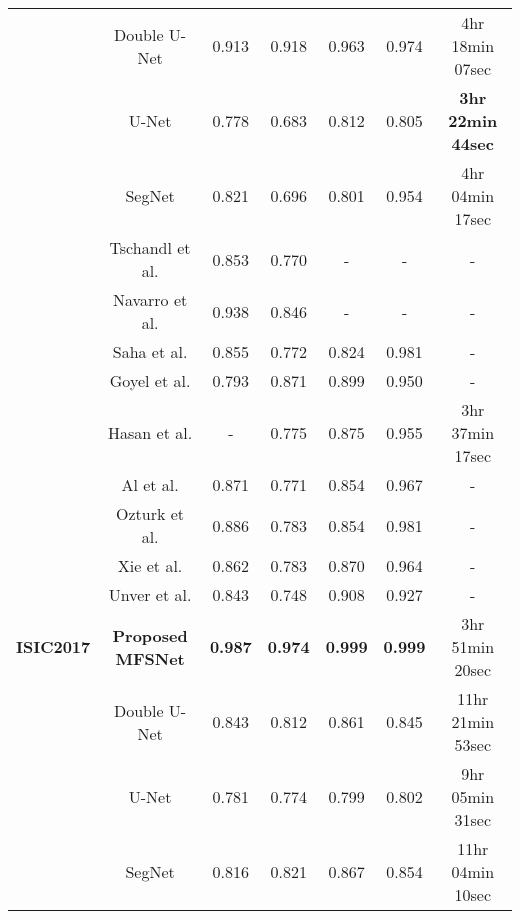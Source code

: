 \documentclass[review]{elsarticle}
\begin{document}
\begin{table}[]
{\begin{tabular}{|c|c|c|c|c|c|c|}
 & Double   U-Net \cite{jha2020doubleu}          & 0.913 & 0.918 & 0.963  & 0.974 & 4hr 18min 07sec          \\ \cline{2-7} 
 & U-Net \cite{ronneberger2015u}                 & 0.778 & 0.683 & 0.812  & 0.805 & \textbf{3hr 22min 44sec} \\ \cline{2-7} 
 & SegNet \cite{badrinarayanan2017segnet}        & 0.821 & 0.696 & 0.801  & 0.954 & 4hr 04min 17sec          \\ \cline{2-7} 
 & Tschandl et al. \cite{tschandl2019domain}     & 0.853 & 0.770 & -      & -     & -                        \\ \cline{2-7} 
 & Navarro et al. \cite{navarro2018accurate}     & 0.938 & 0.846 & -      & -     & -                        \\ \cline{2-7} 
 & Saha et al. \cite{saha2020leveraging}         & 0.855 & 0.772 & 0.824  & 0.981 & -                        \\ \cline{2-7} 
 & Goyel et al. \cite{goyal2019skin}             & 0.793 & 0.871 & 0.899  & 0.950 & -                        \\ \cline{2-7} 
 & Hasan et al. \cite{hasan2020dsnet}            & -     & 0.775 & 0.875  & 0.955 & 3hr 37min 17sec          \\ \cline{2-7} 
 & Al et al. \cite{al2018skin}                   & 0.871 & 0.771 & 0.854  & 0.967 & -                        \\ \cline{2-7} 
 & Ozturk et al. \cite{ozturk2020skin}           & 0.886 & 0.783 & 0.854  & 0.981 & -                        \\ \cline{2-7} 
 & Xie et al. \cite{xie2020skin}                 & 0.862 & 0.783 & 0.870  & 0.964 & -                        \\ \cline{2-7} 
 & Unver et al. \cite{unver2019skin}             & 0.843 & 0.748 & 0.908  & 0.927 & -                        \\ \cline{2-7} 
\multirow{-13}{*}{\textbf{ISIC2017}} & \textbf{Proposed MFSNet} & \textbf{0.987} & \textbf{0.974} & \textbf{0.999} & \textbf{0.999} & 3hr 51min 20sec              \\ \hline
 & Double   U-Net \cite{jha2020doubleu}          & 0.843 & 0.812 & 0.861  & 0.845 & 11hr 21min 53sec         \\ \cline{2-7} 
 & U-Net \cite{ronneberger2015u}                 & 0.781 & 0.774 & 0.799  & 0.802 & 9hr 05min 31sec          \\ \cline{2-7} 
 & SegNet \cite{badrinarayanan2017segnet}        & 0.816 & 0.821 & 0.867  & 0.854 & 11hr 04min 10sec         \\ \cline{2-7} 

\end{tabular}}
\end{table}
\end{document}
